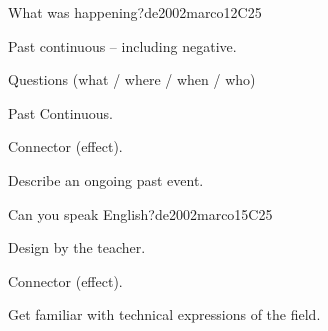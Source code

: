 \begin{syllabus}
\begin{unit}{What was happening?}{}{de2002marco}{12}{C25}
   \begin{topics}
      \item Past continuous – including negative.
      \item Questions (what / where / when / who)
      \item Past Continuous.
      \item Connector (effect).
   \end{topics}

   \begin{learningoutcomes}
      \item Describe an ongoing past event.
   \end{learningoutcomes}
\end{unit}

\begin{unit}{Can you speak English?}{}{de2002marco}{15}{C25}
   \begin{topics}
      \item Design by the teacher.
      \item Connector (effect).
   \end{topics}

   \begin{learningoutcomes}
      \item Get familiar with technical expressions of the field.
   \end{learningoutcomes}
\end{unit}

\begin{coursebibliography}
\end{coursebibliography}

\end{syllabus}
%
